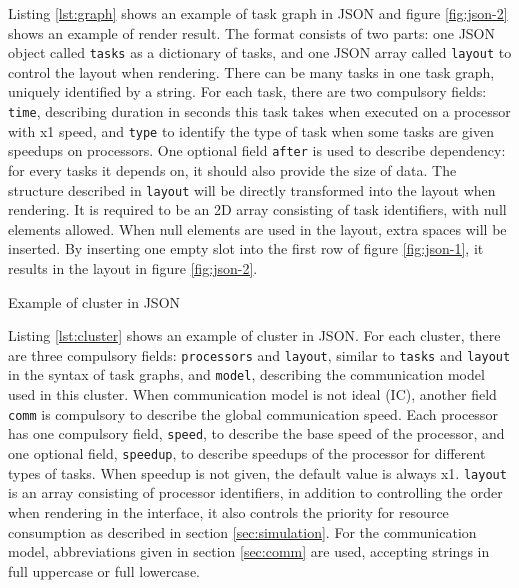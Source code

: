 \documentclass[msc,deptreport, cs]{infthesis}
\begin{document}
Listing \ref{lst:graph} shows an example of task graph in JSON and figure \ref{fig:json-2} shows an example of render result. The format consists of two parts: one JSON object called \verb+tasks+ as a dictionary of tasks, and one JSON array called \verb+layout+ to control the layout when rendering. There can be many tasks in one task graph, uniquely identified by a string. For each task, there are two compulsory fields: \verb+time+, describing duration in seconds this task takes when executed on a processor with x1 speed, and \verb+type+ to identify the type of task when some tasks are given speedups on processors. One optional field \verb+after+ is used to describe dependency: for every tasks it depends on, it should also provide the size of data. The structure described in \verb+layout+ will be directly transformed into the layout when rendering. It is required to be an 2D array consisting of task identifiers, with null elements allowed. When null elements are used in the layout, extra spaces will be inserted. By inserting one empty slot into the first row of figure \ref{fig:json-1}, it results in the layout in figure \ref{fig:json-2}. 

\vspace{0.5em}
\begin{lstfloat}
  
  \caption{Example of cluster in JSON}
  \label{lst:cluster}
  \vspace{-1em}
\end{lstfloat}
\vspace{-0.5em}

Listing \ref{lst:cluster} shows an example of cluster in JSON. For each cluster, there are three compulsory fields: \verb+processors+ and \verb+layout+, similar to \verb+tasks+ and \verb+layout+ in the syntax of task graphs, and \verb+model+, describing the communication model used in this cluster. When communication model is not ideal (IC), another field \verb+comm+ is compulsory to describe the global communication speed. Each processor has one compulsory field, \verb+speed+, to describe the base speed of the processor, and one optional field, \verb+speedup+, to describe speedups of the processor for different types of tasks. When speedup is not given, the default value is always x1. \verb+layout+ is an array consisting of processor identifiers, in addition to controlling the order when rendering in the interface, it also controls the priority for resource consumption as described in section \ref{sec:simulation}. For the communication model, abbreviations given in section \ref{sec:comm} are used, accepting strings in full uppercase or full lowercase.
\end{document}
